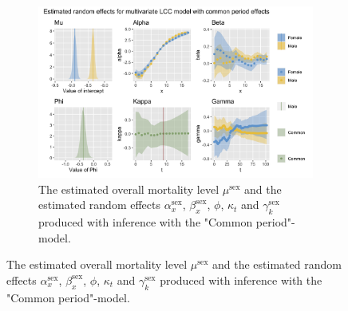 \begin{figure}[h!]
    \centering
    \begin{subfigure}[b]{.75\linewidth}
        \includegraphics[width=\linewidth]{real-data/real-data-multivariate/Figures/effects-LCC-common-period-stomach.png}
        \caption{The estimated overall mortality level $\mu^{\text{sex}}$ and the estimated random effects $\alpha_x^{\text{sex}}$, $\beta_x^{\text{sex}}$, $\phi$, $\kappa_t$ and $\gamma_k^{\text{sex}}$ produced with inference with the "Common period"-model.}
        \label{fig:effects-LCC-stomach-top}
    \end{subfigure}
    

\end{figure}
